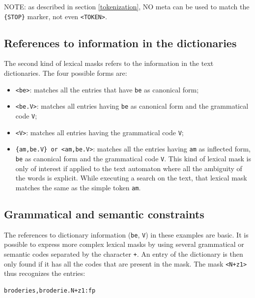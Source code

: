 \bigskip
\noindent NOTE: as described in section \ref{tokenization}, NO meta can be used
to match the \verb+{STOP}+ marker, not even \verb+<TOKEN>+.

\subsection{References to information in the dictionaries}


The second kind of lexical masks refers to the information in the
text dictionaries.
 The four possible forms are:

\bigskip
\begin{itemize}
  \item \verb+<be>+: matches all the entries that have \verb+be+ as canonical
  form;
  \item \verb+<be.V>+: matches all entries having \verb+be+ as canonical form
  and the grammatical code \verb+V+;
  \item \verb+<V>+: matches all entries having the grammatical code \verb+V+;
  \item \verb+{am,be.V} or <am,be.V>+: matches all the entries having
  \verb+am+ as inflected form, \verb+be+ as canonical form and the
  grammatical code \verb+V+. This kind of lexical mask is only of interest if applied
  to the text automaton where all the ambiguity of the words is explicit.
   While executing a
  search on the text, that lexical mask matches the same as the simple token
  \verb+am+.
\end{itemize}

\subsection{Grammatical and semantic constraints}

The references to dictionary information (\verb+be+, \verb+V+) in these examples
are basic. It is possible to express more complex lexical masks by using
several grammatical or semantic codes separated by the character \verb$+$. An
entry of the dictionary is then only found if it has all the codes that are
present in the mask. The mask \verb$<N+z1>$ thus recognizes the entries:

\bigskip
\noindent
\texttt{broderies,broderie.N+z1:fp}

